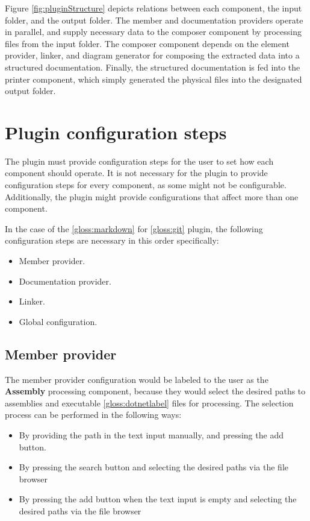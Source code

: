 Figure \ref{fig:pluginStructure} depicts relations between each component, the input folder, and the output folder. The member and documentation providers operate in parallel, and supply necessary data to the composer component by processing files from the input folder.
The composer component depends on the element provider, linker, and diagram generator for composing the extracted data into a structured documentation.
Finally, the structured documentation is fed into the printer component, which simply generated the physical files into the designated output folder.

\section{Plugin configuration steps}

The plugin must provide configuration steps for the user to set how each component should operate. It is not necessary for the plugin to provide configuration steps for every component, as some might not be configurable. Additionally, the plugin might provide configurations that affect more than one component.

In the case of the \ref{gloss:markdown} for \ref{gloss:git} plugin, the following configuration steps are necessary in this order specifically:
\begin{itemize}
    \item Member provider.
    \item Documentation provider.
    \item Linker.
    \item Global configuration.
\end{itemize}

\pagebreak
\subsection{Member provider}

The member provider configuration would be labeled to the user as the \textbf{Assembly} processing component, because they would select the desired paths to assemblies and executable \ref{gloss:dotnetlabel} files for processing. The selection process can be performed in the following ways:
\begin{itemize}
    \item By providing the path in the text input manually, and pressing the add button.
    \item By pressing the search button and selecting the desired paths via the file browser
    \item By pressing the add button when the text input is empty and selecting the desired paths via the file browser
\end{itemize}

